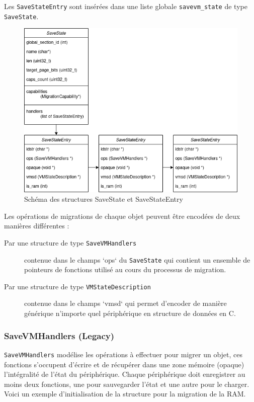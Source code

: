 Les \texttt{SaveStateEntry} sont insérées dans une liste globale \texttt{savevm\_state} de type \texttt{SaveState}. 
\begin{figure}[H]
    \centering
    \includegraphics[width=\textwidth]{include/savestate.png}
    \caption{Schéma des structures SaveState et SaveStateEntry}
\end{figure}

Les opérations de migrations de chaque objet peuvent être encodées de deux manières différentes :
\begin{description}
\item[Par une structure de type \texttt{SaveVMHandlers}] contenue dans le champs `ops` du \texttt{SaveState} qui contient un ensemble de pointeurs de fonctions utilisé au cours du processus de migration.
\item[Par une structure de type \texttt{VMStateDescription}] contenue dans le champs `vmsd` qui permet d'encoder de manière générique n'importe quel périphérique en structure de données en C.
\end{description}

\subsubsection*{SaveVMHandlers (Legacy)}
\texttt{SaveVMHandlers} modélise les opérations à effectuer pour migrer un objet, ces fonctions s'occupent d'écrire et de récupérer dans une zone mémoire (opaque) l'intégralité de l'état du périphérique.
Chaque périphérique doit enregistrer au moins deux fonctions, une pour sauvegarder l'état et une autre pour le charger.
Voici un exemple d'initialisation de la structure pour la migration de la RAM.

